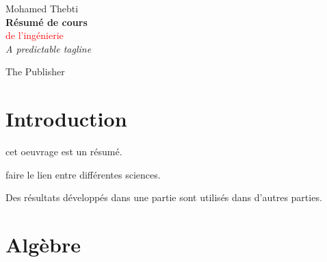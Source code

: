 \newcommand*{\titleTH}{\begingroup %
\raggedleft %
\vspace*{\baselineskip} %

{\Large Mohamed Thebti}\\[0.167\textheight] %

{\LARGE\bfseries Résumé de cours}\\[\baselineskip] %

{\textcolor{Red}{\Huge de l'ingénierie}}\\[\baselineskip] %

{\Large \textit{A predictable tagline}}\par %

\vfill %

{\large The Publisher \plogo}\par %

\vspace*{3\baselineskip} %
\endgroup}


 
\pagestyle{empty} %

\titleTH %


\setlength{\parindent}{0cm}

\newpage
\tableofcontents

\newpage
\section{Introduction}

cet oeuvrage est un résumé. 

faire le lien entre différentes sciences.

Des résultats développés dans une partie sont utilisés dans d'autres parties.

\newpage
\section{Algèbre}

